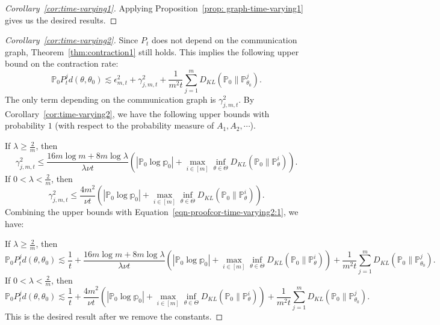 \documentclass[twoside,11pt]{article}
\numberwithin{equation}{section}
\newcommand\bP{\mathbb{P}}
\newcommand\bp{\mathbb{p}}
\begin{document}
{\begin{proof}[Corollary~\ref{cor:time-varying1}]
Applying Proposition~\ref{prop: graph-time-varying1} gives us the desired results. 
\end{proof}
\begin{proof}[Corollary~\ref{cor:time-varying2}]
    Since $P_t$ does not depend on the communication graph, Theorem~\ref{thm:contraction1} still holds.  This implies the following upper bound on the contraction rate: 
    \begin{equation} \label{eqn-proofcor-time-varying2:1}
    \bP_0 P_t^j d(\theta, \theta_0) \lesssim \epsilon_{m,t}^2 + \gamma_{j,m,t}^2+ \frac{1}{m^2 t} \sum_{j = 1}^m D_{KL}(\bP_0 \parallel \bP_{\theta_0}^j). 
\end{equation}
The only term depending on the communication graph is $\gamma_{j,m,t}^2$. By Corollary~\ref{cor:time-varying2}, we have the following upper bounds with probability $1$ (with respect to the probability measure of $A_1, A_2, \cdots$). 

If $\lambda \geq \frac{2}{m}$, then
    \begin{equation*}
\gamma_{j,m,t}^2 \leq  \frac{16 m \log m + 8m \log \lambda}{\lambda \nu t} \left(|\bP_0\log \bp_0| +  \max_{i \in [m]}\inf_{\theta \in \Theta} D_{KL}(\bP_0 \parallel \bP_\theta^i) \right). 
    \end{equation*}
If $0<\lambda < \frac{2}{m}$, then
    \begin{equation*}
\gamma_{j,m,t}^2 \leq  \frac{4m^2}{\nu t}\left(|\bP_0\log \bp_0| +  \max_{i \in [m]}\inf_{\theta \in \Theta} D_{KL}(\bP_0 \parallel \bP_\theta^i) \right). 
    \end{equation*}
Combining the upper bounds with Equation~\eqref{eqn-proofcor-time-varying2:1}, we have: 

If $\lambda \geq \frac{2}{m}$, then
\begin{equation*}
    \bP_0 P_t^j d(\theta, \theta_0) \lesssim  \frac{1}{t} + \frac{16 m \log m + 8m \log \lambda}{\lambda \nu t} \left(|\bP_0\log \bp_0| +  \max_{i \in [m]}\inf_{\theta \in \Theta} D_{KL}(\bP_0 \parallel \bP_\theta^i) \right) + \frac{1}{m^2 t} \sum_{j = 1}^m D_{KL}(\bP_0 \parallel \bP_{\theta_0}^j). 
\end{equation*}
If $0<\lambda < \frac{2}{m}$, then
\begin{equation*}
    \bP_0 P_t^j d(\theta, \theta_0) \lesssim  \frac{1}{t} + \frac{4m^2}{\nu t}\left(|\bP_0\log \bp_0| +  \max_{i \in [m]}\inf_{\theta \in \Theta} D_{KL}(\bP_0 \parallel \bP_\theta^i) \right)+ \frac{1}{m^2 t} \sum_{j = 1}^m D_{KL}(\bP_0 \parallel \bP_{\theta_0}^j). 
\end{equation*}
This is the desired result after we remove the constants. 
\end{proof}
}
\end{document}
